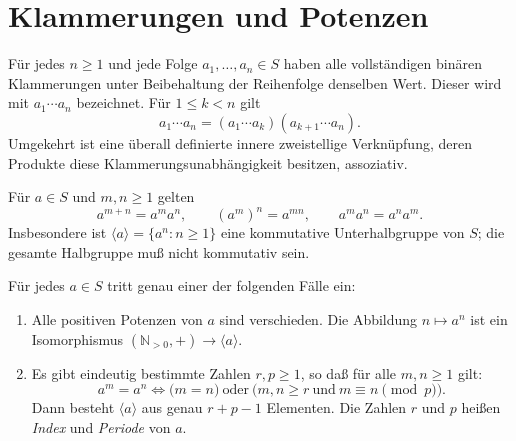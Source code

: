 \section{Klammerungen und Potenzen}

\begin{theorem}
\label{b28guide:thm:bracketing}
Für jedes $n\geq1$ und jede Folge $a_1,\ldots,a_n\in S$
haben alle vollständigen binären Klammerungen unter Beibehaltung
der Reihenfolge denselben Wert. Dieser wird mit $a_1\cdots a_n$
bezeichnet. Für $1\leq k<n$ gilt
\[
 a_1\cdots a_n=(a_1\cdots a_k)(a_{k+1}\cdots a_n).
\]
Umgekehrt ist eine überall definierte innere zweistellige Verknüpfung,
deren Produkte diese Klammerungsunabhängigkeit besitzen, assoziativ.
\cite{projectbracketing,harju}
\end{theorem}

\begin{theorem}
Für $a\in S$ und $m,n\geq1$ gelten
\[
 a^{m+n}=a^ma^n,\qquad (a^m)^n=a^{mn},
 \qquad a^ma^n=a^na^m.
\]
Insbesondere ist $\langle a\rangle=\{a^n:n\geq1\}$ eine
kommutative Unterhalbgruppe von $S$; die gesamte Halbgruppe
muß nicht kommutativ sein. \cite{harju,gould}
\end{theorem}

\begin{theorem}
\label{b28guide:thm:monogenic}
Für jedes $a\in S$ tritt genau einer der folgenden Fälle ein:
\begin{enumerate}
\item Alle positiven Potenzen von $a$ sind verschieden. Die Abbildung
$n\mapsto a^n$ ist ein Isomorphismus
$(\mathbb N_{>0},+)\to\langle a\rangle$.
\item Es gibt eindeutig bestimmte Zahlen $r,p\geq1$, so daß für alle $m,n\geq1$ gilt:
\[
 a^m=a^n
 \iff
 \bigl(m=n\bigr)\ \text{oder}\
 \bigl(m,n\geq r\ \text{und}\ m\equiv n\pmod p\bigr)
.
\]
Dann besteht $\langle a\rangle$ aus genau $r+p-1$ Elementen.
Die Zahlen $r$ und $p$ heißen \emph{Index} und \emph{Periode} von $a$.
\end{enumerate}
\cite{harju,gould}
\end{theorem}

